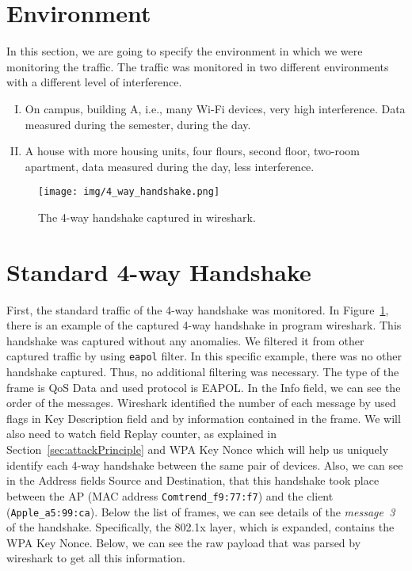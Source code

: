 \section{Environment}
In this section, we are going to specify the environment in which we were monitoring the traffic. The traffic was monitored in two different environments with a different level of interference.

\begin{enumerate}[I.]
\label{enum:environments}
    \item On campus, building A, i.e., many Wi-Fi devices, very high interference. Data measured during the semester, during the day.
    \item \label{env:B} A house with more housing units, four flours, second floor, two-room apartment, data measured during the day, less interference.
\end{enumerate}

\begin{figure}[h!]
  \centering
  \texttt{[image: img/4\_way\_handshake.png]}
  \caption[The 4-way handshake captured in wireshark]{The 4-way handshake captured in wireshark.}
  \label{fig:4wayHandshake}
\end{figure}

\section{Standard 4-way Handshake}
\label{sec:standardFourWayHandshake}

First, the standard traffic of the 4-way handshake was monitored. In Figure~\ref{fig:4wayHandshake}, there is an example of the captured 4-way handshake in program wireshark. This handshake was captured without any anomalies. We filtered it from other captured traffic by using \texttt{eapol} filter. In this specific example, there was no other handshake captured. Thus, no additional filtering was necessary. The type of the frame is QoS Data and used protocol is EAPOL. In the Info field, we can see the order of the messages. Wireshark identified the number of each message by used flags in Key Description field and by information contained in the frame. We will also need to watch field Replay counter, as explained in Section~\ref{sec:attackPrinciple} and WPA Key Nonce which will help us uniquely identify each 4-way handshake between the same pair of devices. Also, we can see in the Address fields Source and Destination, that this handshake took place between the AP (MAC address \texttt{Comtrend\_f9:77:f7}) and the client (\texttt{Apple\_a5:99:ca}). Below the list of frames, we can see details of the \textit{message~3} of the handshake. Specifically, the 802.1x layer, which is expanded, contains the WPA Key Nonce. Below, we can see the raw payload that was parsed by wireshark to get all this information.


